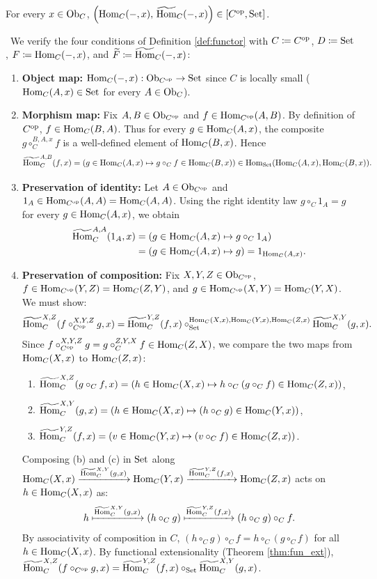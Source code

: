 \documentclass[10pt,a4paper]{article}
\begin{document}
\begin{lemma}\label{lem:contra_hom}
For every $x \in {\textrm{Ob}}_C$, $\left({\textrm{Hom}}_C(-, x),\, {\widetilde{{\textrm{Hom}}}\textrm{}}_C(-,x)\right) \in [C^{\textrm{op}},{\textrm{Set}}]$.
\end{lemma}
\myprf\ We verify the four conditions of Definition \ref{def:functor} with $C \coloneqq C^{\textrm{op}}$, $D \coloneqq {\textrm{Set}}$, $F \coloneqq {\textrm{Hom}}_C(-,x)$, and ${\widetilde{F}\textrm{}} \coloneqq {\widetilde{{\textrm{Hom}}}\textrm{}}_C(-,x)$:
\begin{enumerate}
\item \textbf{Object map:} ${\textrm{Hom}}_C(-, x) : {\textrm{Ob}}_{C^{\textrm{op}}} \to {\textrm{Set}}$ since $C$ is locally small (${\textrm{Hom}}_C(A,x) \in {\textrm{Set}}$ for every $A \in {\textrm{Ob}}_C$).
\item \textbf{Morphism map:} Fix $A,B \in {\textrm{Ob}}_{C^{\textrm{op}}}$ and $f \in {\textrm{Hom}}_{C^{\textrm{op}}}(A,B)$. By definition of $C^{\textrm{op}}$, $f \in {\textrm{Hom}}_C(B,A)$. Thus for every $g \in {\textrm{Hom}}_C(A,x)$, the composite $g \circ_C^{B,A,x} f$ is a well-defined element of ${\textrm{Hom}}_C(B,x)$. Hence
$${\widetilde{{\textrm{Hom}}}\textrm{}}_C^{A,B}(f, x) = \left(g \in {\textrm{Hom}}_C(A,x) \mapsto g \circ_C f \in {\textrm{Hom}}_C(B,x)\right) \in {\textrm{Hom}}_{\textrm{Set}}({\textrm{Hom}}_C(A,x), {\textrm{Hom}}_C(B,x)).$$
\item \textbf{Preservation of identity:} Let $A \in {\textrm{Ob}}_{C^{\textrm{op}}}$ and $1_A \in {\textrm{Hom}}_{C^{\textrm{op}}}(A,A) = {\textrm{Hom}}_C(A,A)$. Using the right identity law $g \circ_C 1_A = g$ for every $g \in {\textrm{Hom}}_C(A,x)$, we obtain
\begin{align*}
{\widetilde{{\textrm{Hom}}}\textrm{}}_C^{A,A}(1_A, x) &= \left(g \in {\textrm{Hom}}_C(A,x) \mapsto g \circ_C 1_A\right) \\
&= \left(g \in {\textrm{Hom}}_C(A,x) \mapsto g\right) = 1_{{\textrm{Hom}}_C(A,x)}.
\end{align*}
\item \textbf{Preservation of composition:} Fix $X,Y,Z \in {\textrm{Ob}}_{C^{\textrm{op}}}$, $f \in {\textrm{Hom}}_{C^{\textrm{op}}}(Y,Z) = {\textrm{Hom}}_C(Z,Y)$, and $g \in {\textrm{Hom}}_{C^{\textrm{op}}}(X,Y) = {\textrm{Hom}}_C(Y,X)$. We must show:
$${\widetilde{{\textrm{Hom}}}\textrm{}}_C^{X,Z}(f \circ_{C^{\textrm{op}}}^{X,Y,Z} g, x) = {\widetilde{{\textrm{Hom}}}\textrm{}}_C^{Y,Z}(f,x) \circ_{\textrm{Set}}^{{\textrm{Hom}}_C(X,x),{\textrm{Hom}}_C(Y,x),{\textrm{Hom}}_C(Z,x)} {\widetilde{{\textrm{Hom}}}\textrm{}}_C^{X,Y}(g,x).$$
Since $f \circ_{C^{\textrm{op}}}^{X,Y,Z} g = g \circ_C^{Z,Y,X} f \in {\textrm{Hom}}_C(Z,X)$, we compare the two maps from ${\textrm{Hom}}_C(X,x)$ to ${\textrm{Hom}}_C(Z,x)$:
\begin{enumerate}
\item[(a)] ${\widetilde{{\textrm{Hom}}}\textrm{}}_C^{X,Z}(g \circ_C f, x) = \left(h \in {\textrm{Hom}}_C(X,x) \mapsto h \circ_C (g \circ_C f) \in {\textrm{Hom}}_C(Z,x)\right)$,
\item[(b)] ${\widetilde{{\textrm{Hom}}}\textrm{}}_C^{X,Y}(g, x) = \left(h \in {\textrm{Hom}}_C(X,x) \mapsto (h \circ_C g) \in {\textrm{Hom}}_C(Y,x)\right)$,
\item[(c)] ${\widetilde{{\textrm{Hom}}}\textrm{}}_C^{Y,Z}(f, x) = \left(v \in {\textrm{Hom}}_C(Y,x) \mapsto (v \circ_C f) \in {\textrm{Hom}}_C(Z,x)\right)$.
\end{enumerate}
Composing (b) and (c) in ${\textrm{Set}}$ along ${\textrm{Hom}}_C(X,x) \xrightarrow{{\widetilde{{\textrm{Hom}}}\textrm{}}_C^{X,Y}(g, x)} {\textrm{Hom}}_C(Y,x) \xrightarrow{{\widetilde{{\textrm{Hom}}}\textrm{}}_C^{Y,Z}(f, x)} {\textrm{Hom}}_C(Z,x)$ acts on $h \in {\textrm{Hom}}_C(X,x)$ as:
$$h \xmapsto{{\widetilde{{\textrm{Hom}}}\textrm{}}_C^{X,Y}(g, x)} (h \circ_C g) \xmapsto{{\widetilde{{\textrm{Hom}}}\textrm{}}_C^{Y,Z}(f, x)} (h \circ_C g) \circ_C f.$$
By associativity of composition in $C$, $(h \circ_C g) \circ_C f = h \circ_C (g \circ_C f)$ for all $h \in {\textrm{Hom}}_C(X,x)$. By functional extensionality (Theorem \ref{thm:fun_ext}), ${\widetilde{{\textrm{Hom}}}\textrm{}}_C^{X,Z}(f \circ_{C^{\textrm{op}}} g, x) = {\widetilde{{\textrm{Hom}}}\textrm{}}_C^{Y,Z}(f,x) \circ_{\textrm{Set}} {\widetilde{{\textrm{Hom}}}\textrm{}}_C^{X,Y}(g,x)$.
\end{enumerate}
\end{document}
